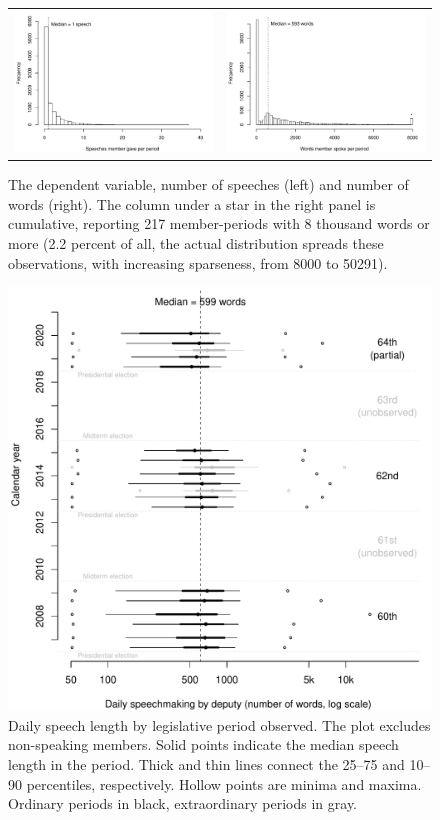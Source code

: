 \documentclass[letter,12pt]{article}
\begin{document}
\begin{figure}
  \centering
  \begin{tabular}{cc}
    \includegraphics[width=.49\columnwidth]{../plots/dv-nspeech-histogram.pdf} &
    \includegraphics[width=.49\columnwidth]{../plots/dv-histogram.pdf}
  \end{tabular}
    \caption{The dependent variable, number of speeches (left) and number of words (right). The column under a star in the right panel is cumulative, reporting 217 member-periods with 8 thousand words or more (2.2 percent of all, the actual distribution spreads these observations, with increasing sparseness, from 8000 to 50291).}\label{F:dv-hist}
\end{figure}




\begin{figure}
  \centering
    \includegraphics[width=.5\columnwidth]{../plots/quantiles-periodo.pdf}
    \caption{Daily speech length by legislative period observed. The plot excludes non-speaking members. Solid points indicate the median speech length in the period. Thick and thin lines connect the 25--75 and 10--90 percentiles, respectively. Hollow points are minima and maxima. Ordinary periods in black, extraordinary periods in gray.}\label{F:quantiles}
\end{figure}
\end{document}
